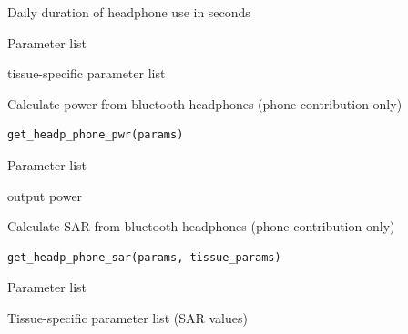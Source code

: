 \documentclass[a4paper]{book}
\begin{document}
%
\begin{Arguments}
\begin{ldescription}
\item[\code{duration\_headphones}] Daily duration of headphone use in seconds

\item[\code{params}] Parameter list

\item[\code{tissue\_params}] tissue-specific parameter list
\end{ldescription}
\end{Arguments}
%
\begin{Description}
Calculate power from bluetooth headphones (phone contribution only)
\end{Description}
%
\begin{Usage}
\begin{verbatim}
get_headp_phone_pwr(params)
\end{verbatim}
\end{Usage}
%
\begin{Arguments}
\begin{ldescription}
\item[\code{params}] Parameter list
\end{ldescription}
\end{Arguments}
%
\begin{Value}
output power
\end{Value}
%
\begin{Description}
Calculate SAR from bluetooth headphones (phone contribution only)
\end{Description}
%
\begin{Usage}
\begin{verbatim}
get_headp_phone_sar(params, tissue_params)
\end{verbatim}
\end{Usage}
%
\begin{Arguments}
\begin{ldescription}
\item[\code{params}] Parameter list

\item[\code{tissue\_params}] Tissue-specific parameter list (SAR values)
\end{ldescription}
\end{Arguments}
\end{document}

